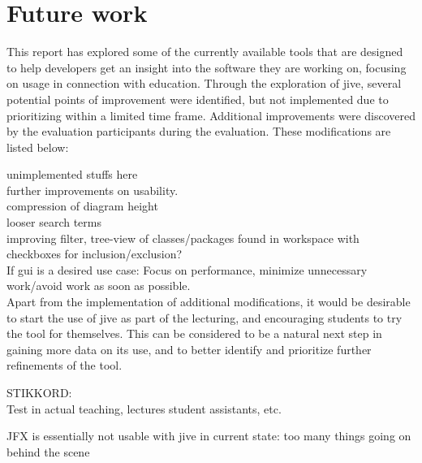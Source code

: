 \section{Future work}\label{conclusionFuture}
This report has explored some of the currently available tools that are designed to help developers get an insight into the software they are working on, focusing on usage in connection with education.
Through the exploration of \gls{jive}, several potential points of improvement were identified, but not implemented due to prioritizing within a limited time frame.
Additional improvements were discovered by the evaluation participants during the evaluation.
These modifications are listed below: %


unimplemented stuffs here\\
further improvements on usability.\\
compression of diagram height\\
looser search terms\\
improving filter, tree-view of classes/packages found in workspace with checkboxes for inclusion/exclusion?\\
If gui is a desired use case: Focus on performance, minimize unnecessary work/avoid work as soon as possible.\\


Apart from the implementation of additional modifications, it would be desirable to start the use of \gls{jive} as part of the lecturing, and encouraging students to try the tool for themselves.
This can be considered to be a natural next step in gaining more data on its use, and to better identify and prioritize further refinements of the tool.


STIKKORD:\\
Test in actual teaching, lectures student assistants, etc.

JFX is essentially not usable with \gls{jive} in current state: too many things going on behind the scene\\



